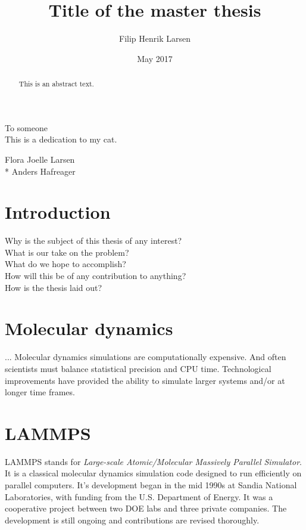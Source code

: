 \documentclass[twoside,english]{uiofysmaster}
\author{Filip Henrik Larsen}
\title{Title of the master thesis}
\date{May 2017}
\begin{document}
\maketitle

\begin{abstract}
This is an abstract text.
\end{abstract}

\begin{dedication}
  To someone
  \\\vspace{12pt}
  This is a dedication to my cat.
\end{dedication}

\begin{acknowledgements}
  Flora Joelle Larsen\\*
  Anders Hafreager
\end{acknowledgements}

\tableofcontents

\chapter{Introduction}

Why is the subject of this thesis of any interest?\\
What is our take on the problem?\\
What do we hope to accomplish?\\
How will this be of any contribution to anything?\\
How is the thesis laid out?


\chapter{Molecular dynamics}
...
Molecular dynamics simulations are computationally expensive. And often scientists must balance statistical precision and CPU time. Technological improvements have provided the ability to simulate larger systems and/or at longer time frames. 

\chapter{LAMMPS}

LAMMPS stands for \textit{Large-scale Atomic/Molecular Massively Parallel Simulator}. It is a classical molecular dynamics simulation code designed to run efficiently on parallel computers. It's development began in the mid 1990s at Sandia National Laboratories, with funding from the U.S. Department of Energy. It was a cooperative project between two DOE labs and three private companies. The development is still ongoing and contributions are revised thoroughly. 
\end{document}
